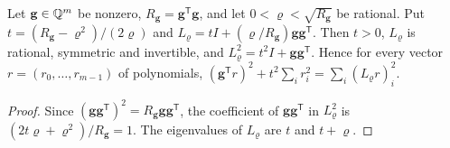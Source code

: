 \begin{lemma}
\label{lem:algebraic-rank-one}
Let $\mathbf g\in\mathbb Q^m$ be nonzero, $R_{\mathbf g}=\mathbf g^{\mathsf T}\mathbf g$,
and let $0<\varrho<\sqrt{R_{\mathbf g}}$ be rational. Put
$t=(R_{\mathbf g}-\varrho^2)/(2\varrho)$ and
$L_\varrho=tI+(\varrho/R_{\mathbf g})\mathbf g\mathbf g^{\mathsf T}$. Then
$t>0$, $L_\varrho$ is rational, symmetric and invertible, and
$L_\varrho^2=t^2I+\mathbf g\mathbf g^{\mathsf T}$. Hence for every vector
$r=(r_0,\ldots,r_{m-1})$ of polynomials,
$(\mathbf g^{\mathsf T}r)^2+t^2\sum_ir_i^2=\sum_i(L_\varrho r)_i^2$.
\end{lemma}

\begin{proof}
Since $(\mathbf g\mathbf g^{\mathsf T})^2=R_{\mathbf g}\mathbf g\mathbf
g^{\mathsf T}$, the coefficient of $\mathbf g\mathbf g^{\mathsf T}$ in
$L_\varrho^2$ is $(2t\varrho+\varrho^2)/R_{\mathbf g}=1$. The eigenvalues of
$L_\varrho$ are $t$ and $t+\varrho$.
\end{proof}

